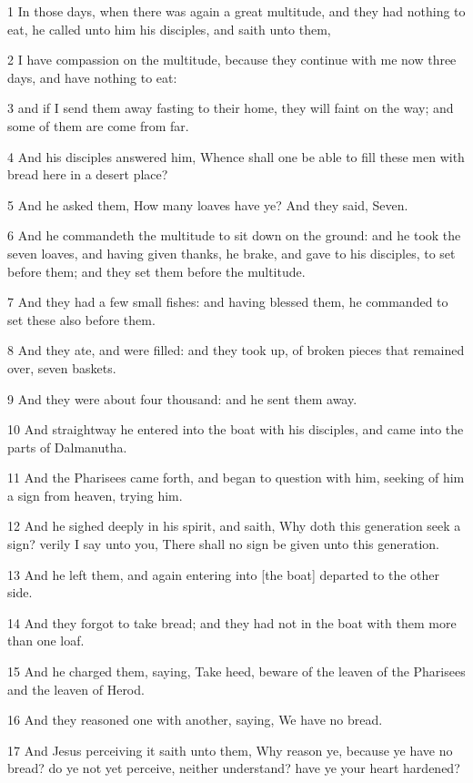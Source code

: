 \par 1 In those days, when there was again a great multitude, and they had nothing to eat, he called unto him his disciples, and saith unto them,
\par 2 I have compassion on the multitude, because they continue with me now three days, and have nothing to eat:
\par 3 and if I send them away fasting to their home, they will faint on the way; and some of them are come from far.
\par 4 And his disciples answered him, Whence shall one be able to fill these men with bread here in a desert place?
\par 5 And he asked them, How many loaves have ye? And they said, Seven.
\par 6 And he commandeth the multitude to sit down on the ground: and he took the seven loaves, and having given thanks, he brake, and gave to his disciples, to set before them; and they set them before the multitude.
\par 7 And they had a few small fishes: and having blessed them, he commanded to set these also before them.
\par 8 And they ate, and were filled: and they took up, of broken pieces that remained over, seven baskets.
\par 9 And they were about four thousand: and he sent them away.
\par 10 And straightway he entered into the boat with his disciples, and came into the parts of Dalmanutha.
\par 11 And the Pharisees came forth, and began to question with him, seeking of him a sign from heaven, trying him.
\par 12 And he sighed deeply in his spirit, and saith, Why doth this generation seek a sign? verily I say unto you, There shall no sign be given unto this generation.
\par 13 And he left them, and again entering into [the boat] departed to the other side.
\par 14 And they forgot to take bread; and they had not in the boat with them more than one loaf.
\par 15 And he charged them, saying, Take heed, beware of the leaven of the Pharisees and the leaven of Herod.
\par 16 And they reasoned one with another, saying, We have no bread.
\par 17 And Jesus perceiving it saith unto them, Why reason ye, because ye have no bread? do ye not yet perceive, neither understand? have ye your heart hardened?
